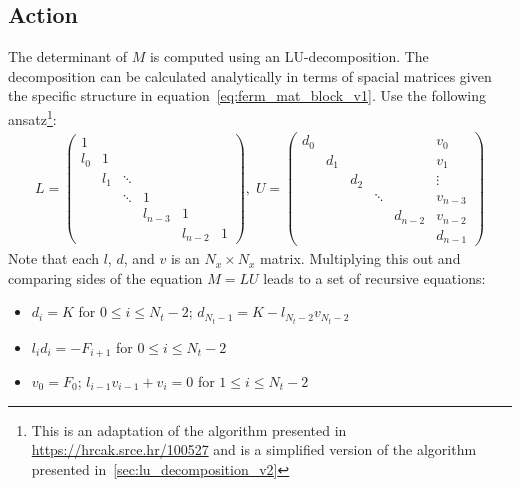 \documentclass[a4paper, fleqn, twoside, notitlepage]{scrartcl}
\begin{document}
\subsection{Action}

The determinant of $M$ is computed using an LU-decomposition. The decomposition can be calculated analytically in terms of spacial matrices given the specific structure in equation~\eqref{eq:ferm_mat_block_v1}.
Use the following ansatz\footnote{This is an adaptation of the algorithm presented in \url{https://hrcak.srce.hr/100527} and is a simplified version of the algorithm presented in~\cref{sec:lu_decomposition_v2}}:
\begin{align}
  L =
  \begin{pmatrix}
    1   &     &    &        &        &\\
    l_0 & 1   &    &        &        &\\
        & l_1 & \ddots &        &        &\\
        &     & \ddots & 1      &        &\\
        &     &   & l_{n-3} & 1      &\\
        &     &   &        & l_{n-2} & 1
  \end{pmatrix},
  \; U =
  \begin{pmatrix}
    d_0 &     &      &   &        & v_0\\
        & d_1 &     &    &        & v_1\\
        &     & d_2 &    &        & \vdots \\
        &     &     & \ddots &        & v_{n-3} \\
        &     &     &    & d_{n-2} & v_{n-2} \\
        &     &     &    &        & d_{n-1}
  \end{pmatrix}
\end{align}
Note that each $l$, $d$, and $v$ is an $N_x \times N_x$ matrix. Multiplying this out and comparing sides of the equation $M = LU$ leads to a set of recursive equations:
\begin{itemize}
\item $d_i = K$ for $0 \le i \le N_t-2$;\hspace{2em} $d_{N_t-1} = K - l_{N_t-2}v_{N_t-2}$
\item $l_i d_i = -F_{i+1}$ for $0 \le i \le N_t-2$
\item $v_0 = F_0$;\hspace{2em} $l_{i-1} v_{i-1} + v_i = 0$ for $1 \le i \le N_t-2$
\end{itemize}
\end{document}
